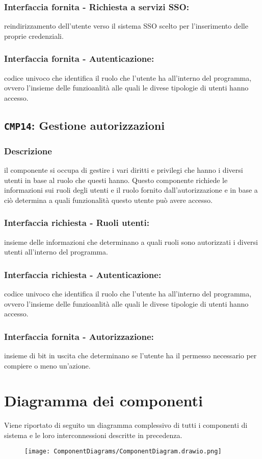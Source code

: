         \subsubsection{Interfaccia fornita - Richiesta a servizi SSO:}
            reindirizzamento dell'utente verso il sistema SSO scelto per l'inserimento delle proprie credenziali.
        \subsubsection{Interfaccia fornita - Autenticazione:}
        codice univoco che identifica il ruolo che l'utente ha all'interno del programma, ovvero l'insieme delle funzioanlità alle quali le divese tipologie di utenti hanno accesso.
    
    \subsection{\texttt{CMP14}: Gestione autorizzazioni}
        \subsubsection{Descrizione}
            il componente si occupa di gestire i vari diritti e privilegi che hanno i diversi utenti in base al ruolo che questi hanno. Questo componente richiede le informazioni sui ruoli degli utenti e il ruolo fornito dall'autorizzazione e in base a ciò determina a quali funzionalità questo utente può avere accesso. 
        \subsubsection{Interfaccia richiesta - Ruoli utenti:}
            insieme delle informazioni che determinano a quali ruoli sono autorizzati i diversi utenti all'interno del programma.
        \subsubsection{Interfaccia richiesta - Autenticazione:}
            codice univoco che identifica il ruolo che l'utente ha all'interno del programma, ovvero l'insieme delle funzioanlità alle quali le divese tipologie di utenti hanno accesso.
        \subsubsection{Interfaccia fornita - Autorizzazione:}
            insieme di bit in uscita che determinano se l'utente ha il permesso necessario per compiere o meno un'azione.

\section{Diagramma dei componenti}
    Viene riportato di seguito un diagramma complessivo di tutti i componenti di sistema e le loro interconnessioni descritte in precedenza.
    \begin{figure}[H]
        \centering
        \texttt{[image: ComponentDiagrams/ComponentDiagram.drawio.png]}
    \end{figure}